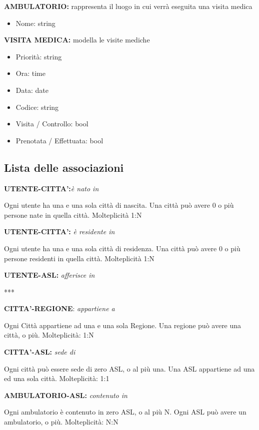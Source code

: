 \documentclass{report}
\begin{document}
\textbf{AMBULATORIO:} 
rappresenta il luogo in cui verrà eseguita una visita medica
\begin{itemize}
\item Nome: string
\end{itemize}

\textbf{VISITA MEDICA:} 
modella le visite mediche 
\begin{itemize}
\item Priorità: string
\item Ora: time
\item Data: date
\item Codice: string
\item Visita / Controllo: bool
\item Prenotata / Effettuata: bool
\end{itemize}

\subsection*{Lista delle associazioni}

\begin{center}
\textbf{UTENTE-CITTA’:}\textit{è nato in}
\end{center}
Ogni utente ha una e una sola città di nascita. Una città può avere 0 o più persone nate in quella città.
Molteplicità 1:N
\begin{center}

\textbf{UTENTE-CITTA’:} \textit{è residente in}
\end{center}
Ogni utente ha una e una sola città di residenza. Una città può avere 0 o più persone residenti in quella città.
Molteplicità 1:N
\begin{center}

\textbf{UTENTE-ASL:} \textit{afferisce in}
\end{center}
***

\begin{center}
\textbf{CITTA’-REGIONE}: \textit{appartiene a}
\end{center}
Ogni Città appartiene ad una e una sola Regione. Una regione può avere una città, o più.
Molteplicità: 1:N
\begin{center}

\textbf{CITTA’-ASL:} \textit{sede di}
\end{center}
 Ogni città può essere sede di zero ASL, o al più una. Una ASL appartiene ad una ed una sola città.
Molteplicità: 1:1
\begin{center}

\textbf{AMBULATORIO-ASL:} \textit{contenuto in}
\end{center}
Ogni ambulatorio è contenuto in  zero ASL, o al più N.  Ogni ASL può avere un ambulatorio, o più.
Molteplicità: N:N
\end{document}
